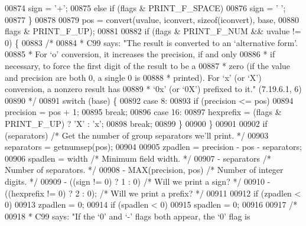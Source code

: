 \begin{DoxyCode}
{{{{{00874             sign = \textcolor{charliteral}{'+'};
00875         \textcolor{keywordflow}{else} \textcolor{keywordflow}{if} (flags & PRINT\_F\_SPACE)
00876             sign = \textcolor{charliteral}{' '};
00877     \}
00878 
00879     pos = convert(uvalue, iconvert, \textcolor{keyword}{sizeof}(iconvert), base,
00880         flags & PRINT\_F\_UP);
00881 
00882     \textcolor{keywordflow}{if} (flags & PRINT\_F\_NUM && uvalue != 0) \{
00883         \textcolor{comment}{/*}
00884 \textcolor{comment}{         * C99 says: "The result is converted to an `alternative form'.}
00885 \textcolor{comment}{         * For `o' conversion, it increases the precision, if and only}
00886 \textcolor{comment}{         * if necessary, to force the first digit of the result to be a}
00887 \textcolor{comment}{         * zero (if the value and precision are both 0, a single 0 is}
00888 \textcolor{comment}{         * printed).  For `x' (or `X') conversion, a nonzero result has}
00889 \textcolor{comment}{         * `0x' (or `0X') prefixed to it." (7.19.6.1, 6)}
00890 \textcolor{comment}{         */}
00891         \textcolor{keywordflow}{switch} (base) \{
00892         \textcolor{keywordflow}{case} 8:
00893             \textcolor{keywordflow}{if} (precision <= pos)
00894                 precision = pos + 1;
00895             \textcolor{keywordflow}{break};
00896         \textcolor{keywordflow}{case} 16:
00897             hexprefix = (flags & PRINT\_F\_UP) ? \textcolor{charliteral}{'X'} : \textcolor{charliteral}{'x'};
00898             \textcolor{keywordflow}{break};
00899         \}
00900     \}
00901 
00902     \textcolor{keywordflow}{if} (separators) \textcolor{comment}{/* Get the number of group separators we'll print. */}
00903         separators = getnumsep(pos);
00904 
00905     zpadlen = precision - pos - separators;
00906     spadlen = width                         \textcolor{comment}{/* Minimum field width. */}
00907         - separators                        \textcolor{comment}{/* Number of separators. */}
00908         - MAX(precision, pos)               \textcolor{comment}{/* Number of integer digits. */}
00909         - ((sign != 0) ? 1 : 0)             \textcolor{comment}{/* Will we print a sign? */}
00910         - ((hexprefix != 0) ? 2 : 0);       \textcolor{comment}{/* Will we print a prefix? */}
00911 
00912     \textcolor{keywordflow}{if} (zpadlen < 0)
00913         zpadlen = 0;
00914     \textcolor{keywordflow}{if} (spadlen < 0)
00915         spadlen = 0;
00916 
00917     \textcolor{comment}{/*}
00918 \textcolor{comment}{     * C99 says: "If the `0' and `-' flags both appear, the `0' flag is}
}}}}}
\end{DoxyCode}
